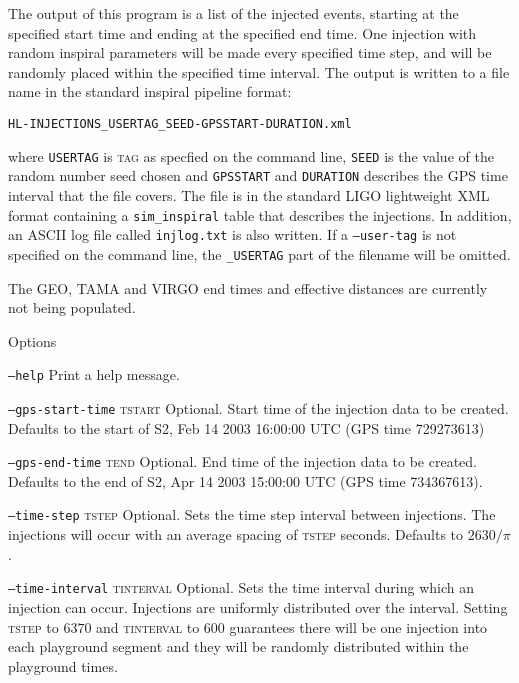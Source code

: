 \begin{entry}
The output of this program  is  a  list  of  the  injected events,  starting
at  the specified start time and ending at the specified end time.  One 
injection with random inspiral parameters will be made every specified time
step, and will be randomly placed within the specified time interval.  
The output is written to a file name in the standard inspiral pipeline format:
\begin{center}
\begin{verbatim}
HL-INJECTIONS_USERTAG_SEED-GPSSTART-DURATION.xml
\end{verbatim}
\end{center}
where \verb$USERTAG$ is \textsc{tag} as specfied on the command line, 
\verb$SEED$ is the  value  of  the random number seed chosen and 
\verb$GPSSTART$ and \verb$DURATION$ describes the GPS time interval that
the file covers. The file is in the standard LIGO lightweight XML format
containing a \texttt{sim\_inspiral} table that describes the injections.
In addition, an ASCII log file called \verb$injlog.txt$ is also written.
If a \texttt{--user-tag} is not specified on the command line, the
\texttt{\_USERTAG} part of the filename will be omitted.

The GEO, TAMA and VIRGO end times and effective distances are currently
not being populated.

\item[Options]\leavevmode
\begin{entry}
\item[\texttt{--help}] Print a help message.

\item[\texttt{--gps-start-time} \textsc{tstart}]
Optional.  Start time of the injection data to be created. Defaults to the
start of S2, Feb 14 2003 16:00:00 UTC (GPS time 729273613)

\item[\texttt{--gps-end-time} \textsc{tend}]
Optional. End time of the injection data to be created. Defaults to the end of
S2, Apr 14 2003 15:00:00 UTC (GPS time 734367613).

\item[\texttt{--time-step} \textsc{tstep}]
Optional. Sets the time step interval between injections. The injections will
occur with an average spacing of \textsc{tstep} seconds. Defaults to 
$2630/\pi$.

\item[\texttt{--time-interval} \textsc{tinterval}]
Optional. Sets the time interval during which an injection can occur. 
Injections are uniformly distributed over the interval.  Setting \textsc{tstep}
to $6370$ and \textsc{tinterval} to 600 guarantees there will be one injection
into each playground segment and they will be randomly distributed within the
playground times.


\end{entry}
\end{entry}
